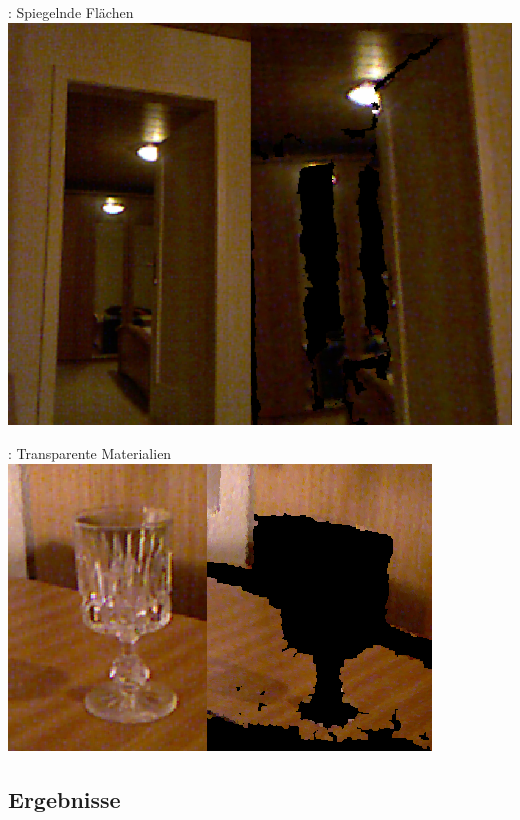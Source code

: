 \documentclass{VLKlauck}
\begin{document}
	\begin{frame}{\insertsubsection: Spiegelnde Flächen}	
		\includegraphics[scale=0.8]{Mirror.png}
	\end{frame}
	
	\begin{frame}{\insertsubsection: Transparente Materialien}	
		\includegraphics[scale=1]{glas.png} 	
	\end{frame}
	
	\subsection{Ergebnisse}
	
\end{document}
